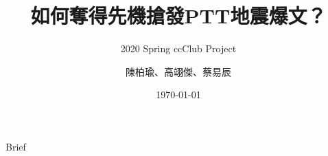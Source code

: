 \documentclass[10pt]{beamer}
\title{如何奪得先機搶發PTT地震爆文？} %
\subtitle{2020 Spring ccClub Project}
\author[Boyie]{陳柏瑜、高翊傑、蔡易辰}
\institute[NTU]{
    Graduate Institute of Economics\\
    National Taiwan University\\
} %
\date{\today}
\begin{document}
    
    \frame{\titlepage}

    \begin{frame}{Brief}
        \tableofcontents
    \end{frame}
    
    

    
    
    
    
    



\end{document}
